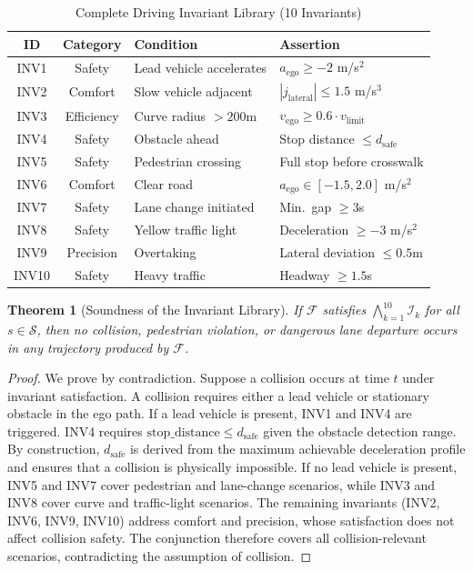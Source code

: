 \documentclass[journal]{IEEEtran}
\theoremstyle{plain}
\newtheorem{theorem}{Theorem}[section]
\newcommand{\sys}{\mathcal{F}}
\begin{document}
\begin{table}[t]
\centering\small
\caption{Complete Driving Invariant Library (10 Invariants)}
\label{tab:invariants}
\begin{tabular}{ccll}
\toprule
\textbf{ID} & \textbf{Category} & \textbf{Condition} & \textbf{Assertion} \\\midrule
INV1 & Safety & Lead vehicle accelerates & $a_{\text{ego}} \geq -2$ m/s$^2$ \\
INV2 & Comfort & Slow vehicle adjacent & $|j_{\text{lateral}}| \leq 1.5$ m/s$^3$ \\
INV3 & Efficiency & Curve radius $>200$m & $v_{\text{ego}} \geq 0.6\cdot v_{\text{limit}}$ \\
INV4 & Safety & Obstacle ahead & Stop distance $\leq d_{\text{safe}}$ \\
INV5 & Safety & Pedestrian crossing & Full stop before crosswalk \\
INV6 & Comfort & Clear road & $a_{\text{ego}} \in [-1.5,2.0]$ m/s$^2$ \\
INV7 & Safety & Lane change initiated & Min.\ gap $\geq 3$s \\
INV8 & Safety & Yellow traffic light & Deceleration $\geq -3$ m/s$^2$ \\
INV9 & Precision & Overtaking & Lateral deviation $\leq 0.5$m \\
INV10 & Safety & Heavy traffic & Headway $\geq 1.5$s \\
\bottomrule
\end{tabular}
\end{table}

\begin{theorem}[Soundness of the Invariant Library]\label{thm:soundness}
If $\sys$ satisfies $\bigwedge_{k=1}^{10} \mathcal{I}_k$ for all $s \in \mathcal{S}$, then no collision, pedestrian violation, or dangerous lane departure occurs in any trajectory produced by $\sys$.
\end{theorem}

\begin{proof}
We prove by contradiction. Suppose a collision occurs at time $t$ under invariant satisfaction. A collision requires either a lead vehicle or stationary obstacle in the ego path. If a lead vehicle is present, INV1 and INV4 are triggered. INV4 requires $\text{stop\_distance} \leq d_{\text{safe}}$ given the obstacle detection range. By construction, $d_{\text{safe}}$ is derived from the maximum achievable deceleration profile and ensures that a collision is physically impossible. If no lead vehicle is present, INV5 and INV7 cover pedestrian and lane-change scenarios, while INV3 and INV8 cover curve and traffic-light scenarios. The remaining invariants (INV2, INV6, INV9, INV10) address comfort and precision, whose satisfaction does not affect collision safety. The conjunction therefore covers all collision-relevant scenarios, contradicting the assumption of collision.
\end{proof}
\end{document}
